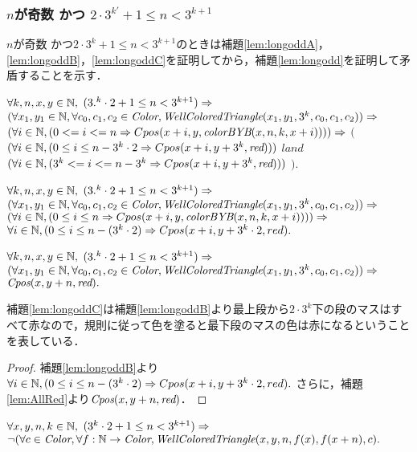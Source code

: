 \subsubsection{$n$が奇数 かつ $2 \cdot 3^{k'} + 1 \leq n < 3^{k+1}$}
$n$が奇数 かつ$2 \cdot 3^{k} + 1 \leq n < 3^{k+1}$のときは補題\ref{lem:longoddA}，\ref{lem:longoddB}，\ref{lem:longoddC}を証明してから，補題\ref{lem:longodd}を証明して矛盾することを示す．
\begin{lem}[\LongOddA] \label{lem:longoddA}
  $\forall k,n,x,y \in \mathbb{N},$
  $(3.^k\cdot2 + 1 \leq n < 3^{k+1}) \Rightarrow$
  $(\forall x_1,y_1 \in \mathbb{N}, \forall c_0,c_1,c_2 \in \textit{Color}, \textit{WellColoredTriangle}(x_1,y_1,3^k,c_0,c_1,c_2)) \Rightarrow$
  $(\forall i \in \mathbb{N},(0 <= i <= n \Rightarrow Cpos(x+i,y,\textit{colorBYB}(x,n,k,x+i)))) \Rightarrow$ 
      $($
        $(\forall i \in \mathbb{N},(0 \leq i \leq n - 3^k\cdot2 \Rightarrow Cpos(x+i,y+3^k,\textit{red})))$
        $land$
        $(\forall i \in \mathbb{N},(3^k <= i <= n - 3^k \Rightarrow Cpos(x+i,y+3^k,\textit{red})))$
      $)$.
\end{lem}
\begin{lem}[\LongOddB] \label{lem:longoddB}
  $\forall k,n,x,y \in \mathbb{N},$
  $(3.^k\cdot2 + 1 \leq n < 3^{k+1}) \Rightarrow$
  $(\forall x_1,y_1 \in \mathbb{N}, \forall c_0,c_1,c_2 \in \textit{Color}, \textit{WellColoredTriangle}(x_1,y_1,3^k,c_0,c_1,c_2)) \Rightarrow$
  $(\forall i \in \mathbb{N},(0 \leq i \leq n \Rightarrow Cpos(x+i, y, \textit{colorBYB}(x,n,k,x+i)))) \Rightarrow$ 
  $\forall i \in \mathbb{N}, (0 \leq i \leq n-(3^k\cdot2) \Rightarrow Cpos(x+i,y+3^k\cdot2,red).$
\end{lem}
\begin{lem}[\LongOddC] \label{lem:longoddC}
  $\forall k,n,x,y \in \mathbb{N},$
  $(3.^k\cdot2 + 1 \leq n < 3^{k+1}) \Rightarrow$
  $(\forall x_1,y_1 \in \mathbb{N}, \forall c_0,c_1,c_2 \in \textit{Color}, \textit{WellColoredTriangle}(x_1,y_1,3^k,c_0,c_1,c_2)) \Rightarrow$
  $\textit{Cpos}(x,y+n,\textit{red}).$
\end{lem}
補題\ref{lem:longoddC}は補題\ref{lem:longoddB}より最上段から$2\cdot3^k$下の段のマスはすべて赤なので，規則に従って色を塗ると最下段のマスの色は赤になるということを表している．
\begin{proof}
  補題\ref{lem:longoddB}より$\forall i \in \mathbb{N}, (0 \leq i \leq n-(3^k\cdot2) \Rightarrow Cpos(x+i,y+3^k\cdot2,red).$
  さらに，補題\ref{lem:AllRed}より$\textit{Cpos}(x,y+n,\textit{red})$．
\end{proof}
\begin{lem}[\LongOdd] \label{lem:longodd}
  $\forall x,y,n,k \in \mathbb{N},$
  $(3^k\cdot2 + 1 \leq n < 3^{k+1}) \Rightarrow$
  $\lnot(\forall c \in \textit{Color}, \forall f:\mathbb{N} \to \textit{Color}, \textit{WellColoredTriangle}(x,y,n,f(x),f(x+n), c).$
\end{lem}
